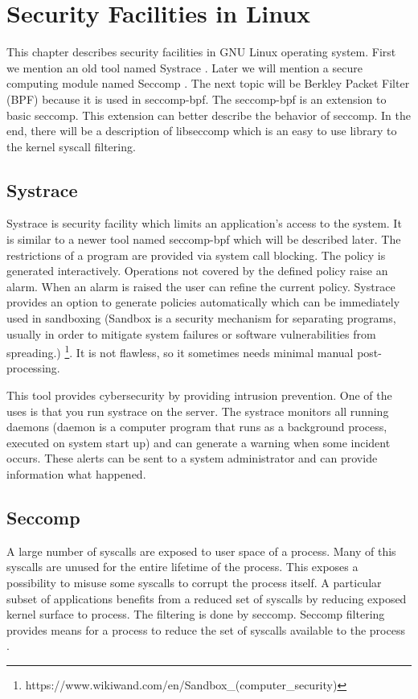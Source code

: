 \chapter{Security Facilities in Linux}
\label{chap:third}
This chapter describes security facilities in GNU Linux operating system.
First we mention an old tool named Systrace \cite{systrace_web}.
Later we will mention a secure computing module named Seccomp \cite{seccomp_sandbox}.
The next topic will be Berkley Packet Filter (BPF) because it is used in seccomp-bpf.
The seccomp-bpf is an extension to basic seccomp.
This extension can better describe the behavior of seccomp.
In the end, there will be a description of libseccomp which is an easy to use library to the kernel syscall filtering.

\section{Systrace}
Systrace is security facility which limits an application's access to the
system. It is similar to a newer tool named seccomp-bpf which will be described
later. The restrictions of a program are provided via system call blocking. The
policy is generated interactively. Operations not covered by the defined policy
raise an alarm. When an alarm is raised the user can refine the current policy.
Systrace provides an option to generate policies automatically which can be
immediately used in sandboxing (Sandbox is a security mechanism for separating
programs, usually in order to mitigate system failures or software
vulnerabilities from spreading.)
\footnote{https://www.wikiwand.com/en/Sandbox\_(computer\_security)}. It is not
flawless, so it sometimes needs minimal manual post-processing.

This tool provides cybersecurity by providing intrusion prevention. One of the
uses is that you run systrace on the server. The systrace monitors all running
daemons (daemon is a computer program that runs as a background process,
executed on system start up) and can generate a warning when some incident
occurs. These alerts can be sent to a system administrator and can provide
information what happened.

\section{Seccomp}
A large number of syscalls are exposed to user space of a process. Many of this
syscalls are unused for the entire lifetime of the process. This exposes a
possibility to misuse some syscalls to corrupt the process itself. A particular
subset of applications benefits from a reduced set of syscalls by reducing
exposed kernel surface to process. The filtering is done by seccomp. Seccomp
filtering provides means for a process to reduce the set of syscalls available
to the process \cite{seccomp_kernel_doc}.

